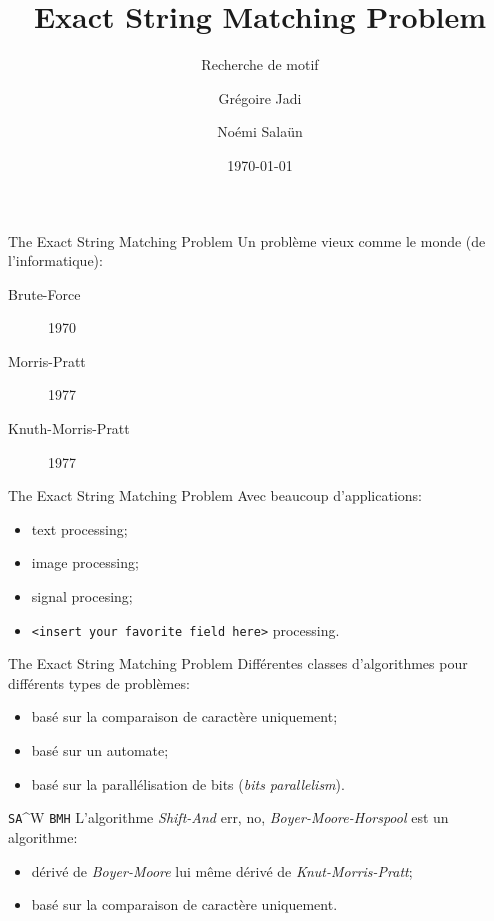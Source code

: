 \documentclass[handout]{beamer}
\begin{document}
\title{Exact String Matching Problem}
\subtitle{Recherche de motif}

\author{Grégoire Jadi \and{} Noémi Salaün}
\date{\today}

\frame{\titlepage}

\begin{frame}{The Exact String Matching Problem}
  Un problème vieux comme le monde (de l'informatique):
  \begin{description}
  \item[Brute-Force] 1970
  \item[Morris-Pratt] 1977
  \item[Knuth-Morris-Pratt] 1977
  \end{description}
\end{frame}

\begin{frame}{The Exact String Matching Problem}
  Avec beaucoup d'applications:
  \begin{itemize}
  \item text processing;
  \item image processing;
  \item signal procesing;
  \item \texttt{<insert your favorite field here>} processing.
  \end{itemize}
\end{frame}

\begin{frame}{The Exact String Matching Problem}
  Différentes classes d'algorithmes pour différents types de problèmes:
  \begin{itemize}
  \item basé sur la comparaison de caractère uniquement;
  \item basé sur un automate;
  \item basé sur la parallélisation de bits (\emph{bits parallelism}).
  \end{itemize}
\end{frame}

\begin{frame}{\texttt{SA}\^{}W \texttt{BMH}}
  L'algorithme \emph{Shift-And} err, no, \emph{Boyer-Moore-Horspool} est un algorithme:
  \begin{itemize}
  \item dérivé de \emph{Boyer-Moore} lui même dérivé de \emph{Knut-Morris-Pratt};
  \item basé sur la comparaison de caractère uniquement.
  \end{itemize}
\end{frame}
\end{document}
